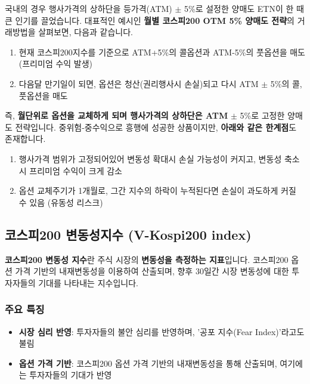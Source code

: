 \documentclass[
  a4paper,
  DIV=11,
  numbers=noendperiod]{scrreprt}
\providecommand{\tightlist}{%
  \setlength{\itemsep}{0pt}\setlength{\parskip}{0pt}}\usepackage{longtable,booktabs,array}
\begin{document}
국내의 경우 행사가격의 상하단을 등가격(ATM) \(\pm\) 5\%로 설정한 양매도
ETN이 한 때 큰 인기를 끌었습니다. 대표적인 예시인 \textbf{월별 코스피200
OTM 5\% 양매도 전략}의 거래방법을 살펴보면, 다음과 같습니다.

\begin{enumerate}
\def\labelenumi{\arabic{enumi}.}
\tightlist
\item
  현재 코스피200지수를 기준으로 ATM+5\%의 콜옵션과 ATM-5\%의 풋옵션을
  매도 (프리미엄 수익 발생)
\item
  다음달 만기일이 되면, 옵션은 청산(권리행사시 손실)되고 다시 ATM
  \(\pm\) 5\%의 콜,풋옵션을 매도
\end{enumerate}

즉, \textbf{월단위로 옵션을 교체하게 되며 행사가격의 상하단은 ATM}
\(\pm\) 5\%로 고정한 양매도 전략입니다. 중위험-중수익으로 흥행에 성공한
상품이지만, \textbf{아래와 같은 한계점}도 존재합니다.

\begin{enumerate}
\def\labelenumi{\arabic{enumi}.}
\tightlist
\item
  행사가격 범위가 고정되어있어 변동성 확대시 손실 가능성이 커지고,
  변동성 축소시 프리미엄 수익이 크게 감소
\item
  옵션 교체주기가 1개월로, 그간 지수의 하락이 누적된다면 손실이 과도하게
  커질 수 있음 (유동성 리스크)
\end{enumerate}

\subsection*{코스피200 변동성지수 (V-Kospi200
index)}\label{uxcf54uxc2a4uxd53c200-uxbcc0uxb3d9uxc131uxc9c0uxc218-v-kospi200-index}

\textbf{코스피200 변동성 지수}란 주식 시장의 \textbf{변동성을 측정하는
지표}입니다. 코스피200 옵션 가격 기반의 내재변동성을 이용하여 산출되며,
향후 30일간 시장 변동성에 대한 투자자들의 기대를 나타내는 지수입니다.

\subsubsection*{주요 특징}\label{uxc8fcuxc694-uxd2b9uxc9d5}

\begin{itemize}
\tightlist
\item
  \textbf{시장 심리 반영}: 투자자들의 불안 심리를 반영하며, '공포
  지수(Fear Index)'라고도 불림
\item
  \textbf{옵션 가격 기반}: 코스피200 옵션 가격 기반의 내재변동성을 통해
  산출되며, 여기에는 투자자들의 기대가 반영
\end{itemize}
\end{document}
